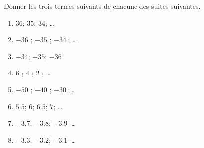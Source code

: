 
\begin{exercice}\label{exo2smath-0054}

    Donner les trois termes suivants de chacune des suites suivantes.
    \begin{enumerate}
        \item
            \( 36\); \( 35\); \( 34\); \ldots
        \item
            $-36$ ; $-35$ ; $-34$ ; \ldots
        \item
            \( -34\); \( -35\); \( -36\)
\item
 $6$ ; $4$ ; $2$ ; \ldots
\item
 $-50$ ; $-40$ ; $-30$ ;\ldots
            \item
                \( 5.5\); \( 6\); \( 6.5\); \( 7\); \ldots
            \item
                \( -3.7\); \( -3.8\); \( -3.9\); \ldots
            \item
                \( -3.3\); \( -3.2\);  \( -3.1\); \ldots
    \end{enumerate}

\end{exercice}
